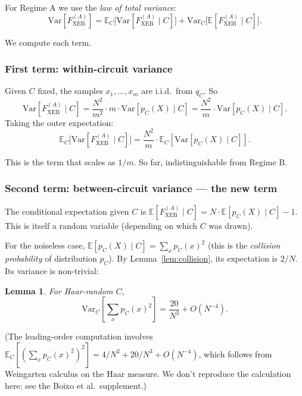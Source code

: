 \documentclass[11pt]{article}
\newtheorem{lemma}[theorem]{Lemma}
\theoremstyle{definition}
\theoremstyle{remark}
\newcommand{\E}{\mathbb{E}}
\newcommand{\Var}{\mathrm{Var}}
\begin{document}
For Regime A we use the \emph{law of total variance}:
\begin{equation}
  \Var[F_{\mathrm{XEB}}^{(A)}] = \E_C\big[\Var[F_{\mathrm{XEB}}^{(A)} \mid C]\big]
  + \Var_C\big[\E[F_{\mathrm{XEB}}^{(A)} \mid C]\big].
  \label{eq:lotv}
\end{equation}

We compute each term.

\subsubsection*{First term: within-circuit variance}

Given $C$ fixed, the samples $x_1, \ldots, x_m$ are i.i.d.\ from $q_C$. So
\begin{equation}
  \Var[F_{\mathrm{XEB}}^{(A)} \mid C] = \frac{N^2}{m^2} \cdot m \cdot
  \Var[p_C(X) \mid C] = \frac{N^2}{m} \cdot \Var[p_C(X) \mid C].
\end{equation}
Taking the outer expectation:
\begin{equation}
  \E_C\big[\Var[F_{\mathrm{XEB}}^{(A)} \mid C]\big]
  = \frac{N^2}{m} \cdot \E_C[\Var[p_C(X) \mid C]].
  \label{eq:within}
\end{equation}

This is the term that scales as $1/m$. So far, indistinguishable from
Regime B.

\subsubsection*{Second term: between-circuit variance --- the new term}

The conditional expectation given $C$ is $\E[F_{\mathrm{XEB}}^{(A)} \mid C]
= N \cdot \E[p_C(X) \mid C] - 1$. This is itself a random variable
(depending on which $C$ was drawn).

For the noiseless case, $\E[p_C(X) \mid C] = \sum_x p_C(x)^2$ (this is the
\emph{collision probability} of distribution $p_C$). By
Lemma~\ref{lem:collision}, its expectation is $2/N$. Its variance is
non-trivial:
\begin{lemma}
\label{lem:between}
For Haar-random $C$,
\[
  \Var_C\!\left[\sum_x p_C(x)^2\right] = \frac{20}{N^3} + O(N^{-4}).
\]
\end{lemma}

(The leading-order computation involves $\E_C[(\sum_x p_C(x)^2)^2] = 4/N^2
+ 20/N^3 + O(N^{-4})$, which follows from Weingarten calculus on the
Haar measure. We don't reproduce the calculation here; see the Boixo et
al.\ supplement.)
\end{document}
